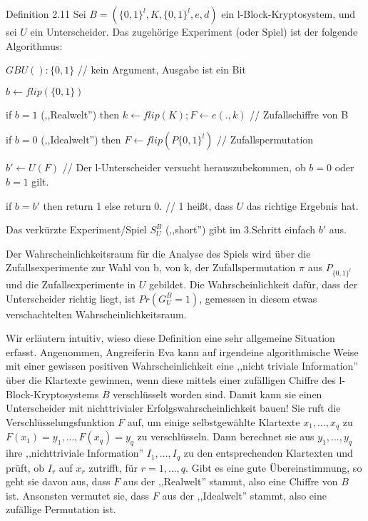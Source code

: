 \documentclass[a4paper]{article}
\begin{document}
\begin{multicols}{3}
    Definition 2.11 Sei $B=(\{0,1\}^l,K,\{0,1\}^l,e,d)$ ein l-Block-Kryptosystem, und sei $U$ ein Unterscheider. Das zugehörige Experiment (oder Spiel) ist der folgende Algorithmus:
    \begin{itemize*}
        \item $GBU():\{0,1\}$ // kein Argument, Ausgabe ist ein Bit
        \begin{enumerate*}
            \item $b\leftarrow flip(\{0,1\})$
            \begin{itemize*}
                \item if $b=1$ (,,Realwelt'') then $k\leftarrow flip(K);F\leftarrow e(.,k)$ // Zufallschiffre von B
                \item if $b=0$ (,,Idealwelt'') then $F\leftarrow flip(P\{0,1\}^l)$ // Zufallspermutation
            \end{itemize*}
            \item $b'\leftarrow U(F)$ // Der l-Unterscheider versucht herauszubekommen, ob $b=0$ oder $b=1$ gilt.
            \item if $b=b'$ then return 1 else return 0.   // 1 heißt, dass $U$ das richtige Ergebnis hat.
        \end{enumerate*}
    \end{itemize*}

    Das verkürzte Experiment/Spiel $S^B_U$ (,,short'') gibt im 3.Schritt einfach $b'$ aus.

    Der Wahrscheinlichkeitsraum für die Analyse des Spiels wird über die Zufallsexperimente zur Wahl von b, von k, der Zufallspermutation $\pi$ aus $P_{\{0,1\}^l}$ und die Zufallsexperimente in $U$ gebildet. Die Wahrscheinlichkeit dafür, dass der Unterscheider richtig liegt, ist $Pr(G^B_U=1)$, gemessen in diesem etwas verschachtelten Wahrscheinlichkeitsraum.

    Wir erläutern intuitiv, wieso diese Definition eine sehr allgemeine Situation erfasst. Angenommen, Angreiferin Eva kann auf irgendeine algorithmische Weise mit einer gewissen positiven Wahrscheinlichkeit eine ,,nicht triviale Information'' über die Klartexte gewinnen, wenn diese mittels einer zufälligen Chiffre des l-Block-Kryptosystems $B$ verschlüsselt worden sind. Damit kann sie einen Unterscheider mit nichttrivialer Erfolgswahrscheinlichkeit bauen! Sie ruft die Verschlüsselungsfunktion $F$ auf, um einige selbstgewählte Klartexte $x_1,...,x_q$ zu $F(x_1)=y_1,...,F(x_q)=y_q$ zu verschlüsseln. Dann berechnet sie aus $y_1,...,y_q$ ihre ,,nichttriviale Information'' $I_1,...,I_q$ zu den entsprechenden Klartexten und prüft, ob $I_r$ auf $x_r$ zutrifft, für $r=1,...,q$. Gibt es eine gute Übereinstimmung, so geht sie davon aus, dass $F$ aus der ,,Realwelt'' stammt, also eine Chiffre von $B$ ist. Ansonsten vermutet sie, dass $F$ aus der ,,Idealwelt'' stammt, also eine zufällige Permutation ist.


\end{multicols}
\end{document}
